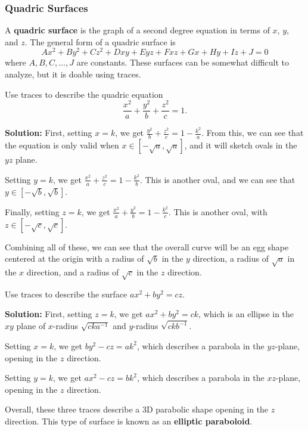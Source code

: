 \subsubsection{Quadric Surfaces}
A \textbf{quadric surface} is the graph of a second degree equation in terms of \(x\), \(y\), and \(z\). The general form of a quadric surface is
\[Ax^2+By^2+Cz^2+Dxy+Eyz+Fxz+Gx+Hy+Iz+J=0\]
where \(A,B,C,\dots,J\) are constants. These surfaces can be somewhat difficult to analyze, but it is doable using traces.
\begin{example}
    Use traces to describe the quadric equation
    \[\frac{x^2}{a}+\frac{y^2}{b}+\frac{z^2}{c}=1.\]\par\textbf{Solution: }First, setting \(x=k\), we get \(\frac{y^2}{b}+\frac{z^2}{c}=1-\frac{k^2}{a}\). From this, we can see that the equation is only valid when \(x\in [-\sqrt a, \sqrt a]\), and it will sketch ovals in the \(yz\) plane. \par Setting \(y=k\), we get \(\frac{x^2}{a}+\frac{z^2}{c}=1-\frac{k^2}{b}\). This is another oval, and we can see that \(y\in[-\sqrt b, \sqrt b]\).\par Finally, setting \(z=k\), we get \(\frac{x^2}{a}+\frac{y^2}{b}=1-\frac{k^2}{c}\). This is another oval, with \(z\in [-\sqrt c, \sqrt c]\).\par
    Combining all of these, we can see that the overall curve will be an egg shape centered at the origin with a radius of \(\sqrt b\) in the \(y\) direction, a radius of \(\sqrt a\) in the \(x\) direction, and a radius of \(\sqrt c\) in the \(z\) direction.
\end{example}
\begin{example}
    Use traces to describe the surface \(ax^2+by^2=cz\).\par\textbf{Solution: }First, setting \(z=k\), we get \(ax^2+by^2=ck\), which is an ellipse in the \(xy\) plane of \(x\)-radius \(\sqrt{cka^{-1}}\) and \(y\)-radius \(\sqrt{ckb^{-1}}\).\par Setting \(x=k\), we get \(by^2-cz=ak^2\), which describes a parabola in the \(yz\)-plane, opening in the \(z\) direction. \par
    Setting \(y=k\), we get \(ax^2-cz=bk^2\), which describes a parabola in the \(xz\)-plane, opening in the \(z\) direction.\par
    Overall, these three traces describe a 3D parabolic shape opening in the \(z\) direction. This type of surface is known as an \textbf{elliptic paraboloid}.
    \begin{figure}[!h]
        \centering
    \end{figure}
\end{example}
